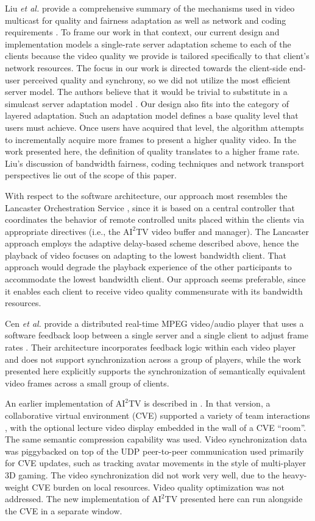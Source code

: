 \documentclass{sig-alternate}
\begin{document}
Liu {\it et al.} provide a comprehensive summary of the mechanisms
used in video multicast for quality and fairness adaptation as well as
network and coding requirements \cite{LIU2003}.  To frame our work in
that context, our current design and implementation models a
single-rate server adaptation scheme to each of the clients because
the video quality we provide is tailored specifically to that client's
network resources.  The focus in our work is directed towards the
client-side end-user perceived quality and synchrony, so we did not
utilize the most efficient server model.  The authors believe that it
would be trivial to substitute in a simulcast server adaptation model
\cite{cheung96use,li99video}.  Our design also fits into the category
of layered adaptation.  Such an adaptation model defines a base
quality level that users must achieve.  Once users have acquired that
level, the algorithm attempts to incrementally acquire more frames to
present a higher quality video.  In the work presented here, the
definition of quality translates to a higher frame rate.  Liu's
discussion of bandwidth fairness, coding techniques and network
transport perspectives lie out of the scope of this paper.

With respect to the software architecture, our approach most resembles
the Lancaster Orchestration Service \cite{Lancaster}, since it is
based on a central controller that coordinates the behavior of remote
controlled units placed within the clients via appropriate directives
(i.e., the $\mathrm{AI}^2$TV video buffer and manager).  The Lancaster
approach employs the adaptive delay-based scheme described above,
hence the playback of video focuses on adapting to the lowest
bandwidth client.  That approach would degrade the playback experience
of the other participants to accommodate the lowest bandwidth client.
Our approach seems preferable, since it enables each client to receive
video quality commensurate with its bandwidth resources.

Cen {\it et al.} provide a distributed real-time MPEG video/audio
player that uses a software feedback loop between a single server and
a single client to adjust frame rates \cite{CEN}.  Their architecture
incorporates feedback logic within each video player and does not
support synchronization across a group of players, while the work
presented here explicitly supports the synchronization of semantically
equivalent video frames across a small group of clients.

An earlier implementation of $\mathrm{AI}^2$TV is described in
\cite{VECTORS}.  In that version, a collaborative virtual environment
(CVE) supported a variety of team interactions \cite{CHIME}, with the
optional lecture video display embedded in the wall of a CVE ``room''.
The same semantic compression capability was used. Video
synchronization data was piggybacked on top of the UDP peer-to-peer
communication used primarily for CVE updates, such as tracking avatar
movements in the style of multi-player 3D gaming.  The video
synchronization did not work very well, due to the heavy-weight CVE
burden on local resources. Video quality optimization was not
addressed.  The new implementation of $\mathrm{AI}^2$TV presented here
can run alongside the CVE in a separate window.
\end{document}

